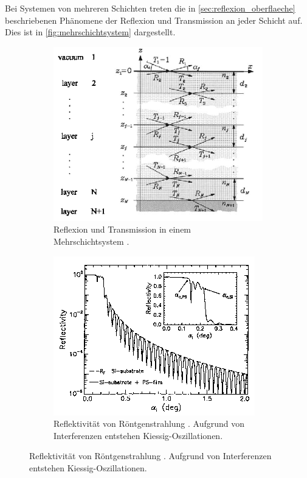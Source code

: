 Bei Systemen von mehreren Schichten treten die in \autoref{sec:reflexion_oberflaeche} beschriebenen Phänomene der Reflexion und Transmission an jeder Schicht auf.
Dies ist in \autoref{fig:mehrschichtsystem} dargestellt.
\begin{figure}
    \centering
    \begin{subfigure}{0.48\textwidth}
        \centering
        \includegraphics[width=\textwidth]{content/img/Abb_9.png}
        \caption{Reflexion und Transmission in einem Mehrschichtsystem \cite{tolan}.}
        \label{fig:mehrschichtsystem}
    \end{subfigure}
    \hfill
    \begin{subfigure}{0.48\textwidth}
        \centering
        \includegraphics[width=\textwidth]{content/img/Abb_10.png}
        \caption{Reflektivität von Röntgenstrahlung \cite{tolan}.
        Aufgrund von Interferenzen entstehen Kiessig-Oszillationen.}
        \label{fig:kiessig_oszillationen}
    \end{subfigure}
\end{figure}
